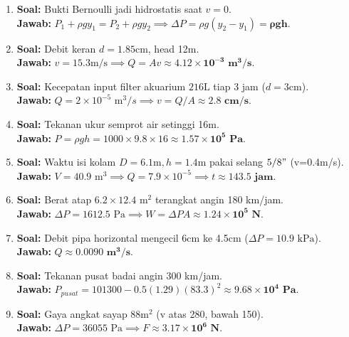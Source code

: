 \documentclass{article}
\begin{document}
\begin{enumerate}[label=\textbf{\arabic*.}]
    \item \textbf{Soal:} Bukti Bernoulli jadi hidrostatis saat $v=0$. \\
    \textbf{Jawab:} $P_1 + \rho gy_1 = P_2 + \rho gy_2 \implies \Delta P = \rho g(y_2-y_1) = \mathbf{\rho gh}$.

    \item \textbf{Soal:} Debit keran $d=1.85\text{cm}$, head 12m. \\
    \textbf{Jawab:} $v=15.3\text{m/s} \implies Q = Av \approx \mathbf{4.12 \times 10^{-3} \text{ m}^3/s}$.

    \item \textbf{Soal:} Kecepatan input filter akuarium $216\text{L}$ tiap 3 jam ($d=3\text{cm}$). \\
    \textbf{Jawab:} $Q = 2 \times 10^{-5} \text{ m}^3/s \implies v = Q/A \approx \mathbf{2.8 \text{ cm/s}}$.

    \item \textbf{Soal:} Tekanan ukur semprot air setinggi 16m. \\
    \textbf{Jawab:} $P = \rho gh = 1000 \times 9.8 \times 16 \approx \mathbf{1.57 \times 10^5 \text{ Pa}}$.

    \item \textbf{Soal:} Waktu isi kolam $D=6.1\text{m}, h=1.4\text{m}$ pakai selang $5/8"$ (v=0.4m/s). \\
    \textbf{Jawab:} $V = 40.9 \text{ m}^3 \implies Q = 7.9 \times 10^{-5} \implies t \approx \mathbf{143.5 \text{ jam}}$.

    \item \textbf{Soal:} Berat atap $6.2 \times 12.4 \text{ m}^2$ terangkat angin 180 km/jam. \\
    \textbf{Jawab:} $\Delta P = 1612.5 \text{ Pa} \implies W = \Delta P A \approx \mathbf{1.24 \times 10^5 \text{ N}}$.

    \item \textbf{Soal:} Debit pipa horizontal mengecil 6cm ke 4.5cm ($\Delta P = 10.9 \text{ kPa}$). \\
    \textbf{Jawab:} $Q \approx \mathbf{0.0090 \text{ m}^3/s}$.

    \item \textbf{Soal:} Tekanan pusat badai angin 300 km/jam. \\
    \textbf{Jawab:} $P_{pusat} = 101300 - 0.5(1.29)(83.3)^2 \approx \mathbf{9.68 \times 10^4 \text{ Pa}}$.

    \item \textbf{Soal:} Gaya angkat sayap $88\text{m}^2$ (v atas 280, bawah 150). \\
    \textbf{Jawab:} $\Delta P = 36055 \text{ Pa} \implies F \approx \mathbf{3.17 \times 10^6 \text{ N}}$.


\end{enumerate}
\end{document}
